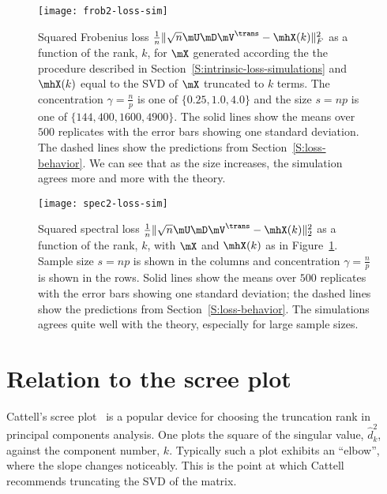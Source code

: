 \begin{figure}[tbh]
    \centering
    \texttt{[image: frob2-loss-sim]}
    \caption{
        Squared Frobenius loss
        \(
            \frac{1}{n} \| \sqrt{n}\mU \mD \mV^\trans - \mhX(k) \|_F^2
        \)
        as a function of the rank, $k$, for
        $\mX$ generated according the the procedure described
        in Section~\ref{S:intrinsic-loss-simulations} and $\mhX(k)$ equal
        to the SVD of $\mX$ truncated to $k$ terms.  The concentration 
        $\gamma = \frac{n}{p}$ is one of $\{ 0.25, 1.0, 4.0 \}$ and the
        size $s = n p$ is one of $\{ 144, 400, 1600, 4900 \}$.  
        The solid lines show the means over $500$ replicates with the error 
        bars showing one standard deviation.  The dashed lines show the 
        predictions from Section~\ref{S:loss-behavior}.  We can see that as 
        the size increases, the simulation agrees more and more with the 
        theory.
    }\label{F:frob2-loss-sim}
\end{figure}

\begin{figure}[hbt]
    \centering
    \texttt{[image: spec2-loss-sim]}
    \caption{
        Squared spectral loss
        \(
            \frac{1}{n} \| \sqrt{n}\mU \mD \mV^\trans - \mhX(k) \|_2^2
        \)
        as a function of the rank, $k$, with $\mX$ and $\mhX(k)$ as in
        Figure~\ref{F:frob2-loss-sim}.  Sample size $s = n p$ is shown in the 
        columns and concentration $\gamma = \frac{n}{p}$ is shown in the rows.
        Solid lines show the means
        over $500$ replicates with the error bars showing one standard 
        deviation; the dashed lines show the predictions from 
        Section~\ref{S:loss-behavior}.  The simulations agrees quite well
        with the theory, especially for large sample sizes.
    }\label{F:spec2-loss-sim}
\end{figure}

\clearpage

\section{Relation to the scree plot}\label{S:intrinsic-rank-scree-plot}

Cattell's scree plot~\cite{cattell1966scree} is a popular device for choosing
the truncation rank in principal components analysis. One plots the square of
the singular value, $\hat d^2_k$, against the component number, $k$. Typically
such a plot exhibits an ``elbow'', where the slope changes noticeably. This is
the point at which Cattell recommends truncating the SVD of the matrix.

